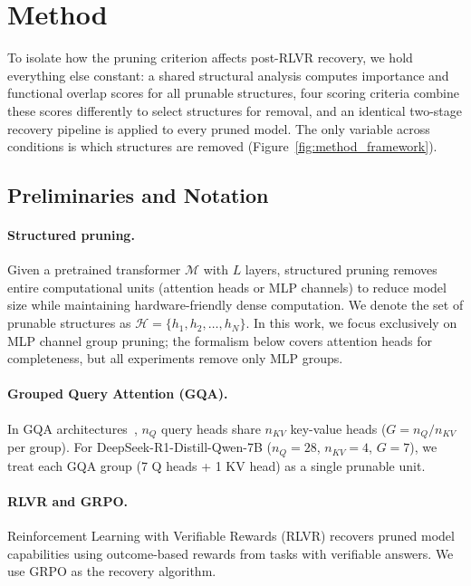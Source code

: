 \section{Method}
\label{sec:method}

To isolate how the pruning criterion affects post-RLVR recovery, we hold everything else constant: a shared structural analysis computes importance and functional overlap scores for all prunable structures, four scoring criteria combine these scores differently to select structures for removal, and an identical two-stage recovery pipeline is applied to every pruned model.
The only variable across conditions is which structures are removed (Figure~\ref{fig:method_framework}).

\subsection{Preliminaries and Notation}
\label{sec:prelim}

\paragraph{Structured pruning.}
Given a pretrained transformer $\mathcal{M}$ with $L$ layers, structured pruning removes entire computational units (attention heads or MLP channels) to reduce model size while maintaining hardware-friendly dense computation.
We denote the set of prunable structures as $\mathcal{H} = \{h_1, h_2, \ldots, h_N\}$.
In this work, we focus exclusively on MLP channel group pruning; the formalism below covers attention heads for completeness, but all experiments remove only MLP groups.

\paragraph{Grouped Query Attention (GQA).}
In GQA architectures~\citep{ainslie2023gqa}, $n_Q$ query heads share $n_{KV}$ key-value heads ($G = n_Q / n_{KV}$ per group).
For DeepSeek-R1-Distill-Qwen-7B ($n_Q{=}28$, $n_{KV}{=}4$, $G{=}7$), we treat each GQA group (7 Q heads + 1 KV head) as a single prunable unit.

\paragraph{RLVR and GRPO.}
Reinforcement Learning with Verifiable Rewards (RLVR) recovers pruned model capabilities using outcome-based rewards from tasks with verifiable answers.
We use GRPO as the recovery algorithm.

